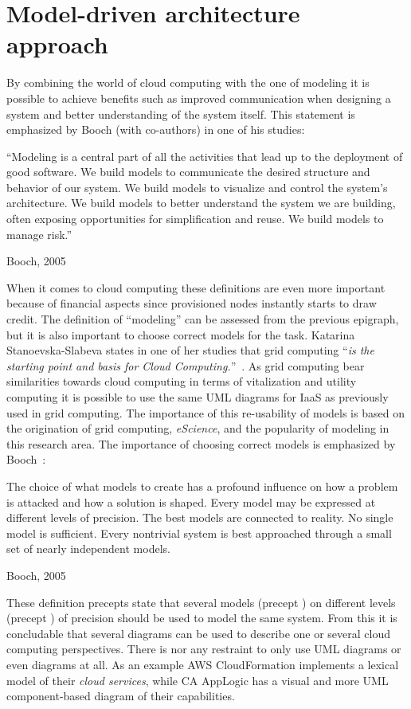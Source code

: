\section{Model-driven architecture approach}

By combining the world of cloud computing with the one of modeling 
it is possible to achieve benefits such as improved communication when designing 
a system and better understanding of the system itself.
This statement is emphasized by Booch (with co-authors) in one of his studies:
\epigraph{
  ``Modeling is a central
  part of all the activities that lead up to the deployment of good
  software. We build models to communicate the desired structure and
  behavior of our system. We build models to visualize and control the
  system's architecture. We build models to better understand the
  system we are building, often exposing opportunities for
  simplification and reuse. We build models to manage risk.''
}{Booch, 2005}
When it comes to cloud computing these definitions are even more important
because of financial aspects since provisioned nodes instantly starts to draw credit.
The definition of ``modeling'' can be assessed from the previous epigraph, but it is 
also important to choose correct models for the task.
Katarina Stanoevska-Slabeva states in one of her studies that grid computing
``\emph{is the starting point and basis for Cloud Computing.}''~\cite{introduction:wozniak10}.
As grid computing bear similarities towards cloud computing in terms of vitalization and utility computing
it is possible to use the same UML diagrams for IaaS as previously used in grid computing.
The importance of this re-usability of models is based on the origination of grid computing, \emph{eScience},
and the popularity of modeling in this research area.
The importance of choosing correct models is emphasized by Booch~\cite{unified:booch05}:
\epigraph{
  \begin{ii}\iitem The choice
  of what models to create has a profound influence on how a problem
  is attacked and how a solution is shaped. \iitem Every model may be
  expressed at different levels of precision. \iitem The best models
  are connected to reality. \iitem No single model is
  sufficient. Every nontrivial system is best approached through a
  small set of nearly independent models.\end{ii}
}{Booch, 2005}
These definition precepts state that several models (precept ) on different levels (precept ) 
of precision should be used to model the same system.
From this it is concludable that several diagrams can be used to describe one or several cloud computing perspectives.
There is nor any restraint to only use UML diagrams or even diagrams at all.
As an example AWS CloudFormation implements a lexical model of their \emph{cloud services},
while CA AppLogic has a visual and more UML component-based diagram of their capabilities.
